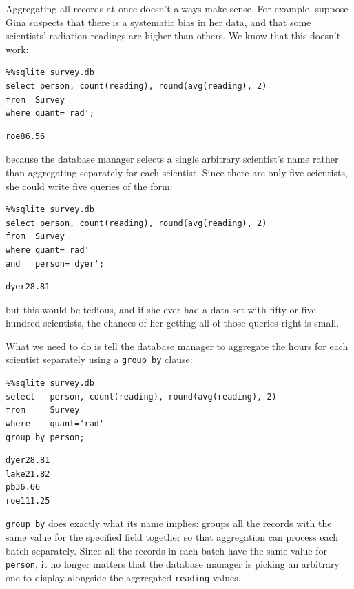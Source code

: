 \documentclass{book}
\begin{document}
Aggregating all records at once doesn't always make sense. For example,
suppose Gina suspects that there is a systematic bias in her data, and
that some scientists' radiation readings are higher than others. We know
that this doesn't work:

\begin{verbatim}
%%sqlite survey.db
select person, count(reading), round(avg(reading), 2)
from  Survey
where quant='rad';
\end{verbatim}

\begin{verbatim}
roe86.56
\end{verbatim}

because the database manager selects a single arbitrary scientist's name
rather than aggregating separately for each scientist. Since there are
only five scientists, she could write five queries of the form:

\begin{verbatim}
%%sqlite survey.db
select person, count(reading), round(avg(reading), 2)
from  Survey
where quant='rad'
and   person='dyer';
\end{verbatim}

\begin{verbatim}
dyer28.81
\end{verbatim}

but this would be tedious, and if she ever had a data set with fifty or
five hundred scientists, the chances of her getting all of those queries
right is small.

What we need to do is tell the database manager to aggregate the hours
for each scientist separately using a \texttt{group by} clause:

\begin{verbatim}
%%sqlite survey.db
select   person, count(reading), round(avg(reading), 2)
from     Survey
where    quant='rad'
group by person;
\end{verbatim}

\begin{verbatim}
dyer28.81
lake21.82
pb36.66
roe111.25
\end{verbatim}

\texttt{group by} does exactly what its name implies: groups all the
records with the same value for the specified field together so that
aggregation can process each batch separately. Since all the records in
each batch have the same value for \texttt{person}, it no longer matters
that the database manager is picking an arbitrary one to display
alongside the aggregated \texttt{reading} values.
\end{document}
